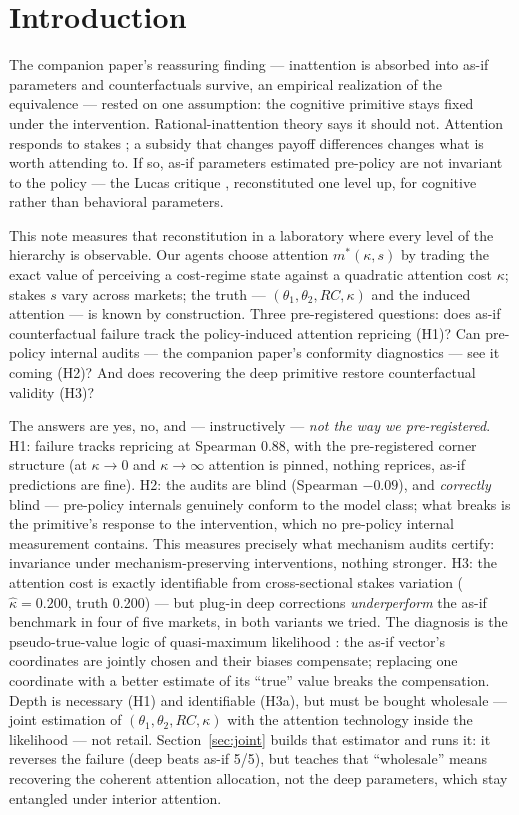 \documentclass[11pt]{article}
\newcommand{\mstar}{m^{*}}
\begin{document}
\section{Introduction}\label{sec:intro}

The companion paper's reassuring finding --- inattention is absorbed into
as-if parameters and counterfactuals survive, an empirical realization of
the \citet{fosgerau2020} equivalence --- rested on one assumption: the
cognitive primitive stays fixed under the intervention. Rational-inattention
theory says it should not. Attention responds to stakes
\citep{matejkamckay2015, gabaix2014, mackowiak2023}; a subsidy that changes
payoff differences changes what is worth attending to. If so, as-if
parameters estimated pre-policy are not invariant to the policy --- the
Lucas critique \citep{lucas1976}, reconstituted one level up, for cognitive
rather than behavioral parameters.

This note measures that reconstitution in a laboratory where every level of
the hierarchy is observable. Our agents choose attention $\mstar(\kappa, s)$
by trading the exact value of perceiving a cost-regime state against a
quadratic attention cost $\kappa$; stakes $s$ vary across markets; the
truth --- $(\theta_1, \theta_2, RC, \kappa)$ and the induced attention ---
is known by construction. Three pre-registered questions: does as-if
counterfactual failure track the policy-induced attention repricing (H1)?
Can pre-policy internal audits --- the companion paper's conformity
diagnostics --- see it coming (H2)? And does recovering the deep primitive
restore counterfactual validity (H3)?

The answers are yes, no, and --- instructively --- \emph{not the way we
pre-registered}. H1: failure tracks repricing at Spearman 0.88, with the
pre-registered corner structure (at $\kappa \to 0$ and $\kappa \to \infty$
attention is pinned, nothing reprices, as-if predictions are fine). H2:
the audits are blind (Spearman $-0.09$), and \emph{correctly} blind ---
pre-policy internals genuinely conform to the model class; what breaks is
the primitive's response to the intervention, which no pre-policy internal
measurement contains. This measures precisely what mechanism audits
certify: invariance under mechanism-preserving interventions, nothing
stronger. H3: the attention cost is exactly identifiable from
cross-sectional stakes variation ($\widehat{\kappa} = 0.200$, truth 0.200)
--- but plug-in deep corrections \emph{underperform} the as-if benchmark in
four of five markets, in both variants we tried. The diagnosis is the
pseudo-true-value logic of quasi-maximum likelihood \citep{white1982}: the
as-if vector's coordinates are jointly chosen and their biases compensate;
replacing one coordinate with a better estimate of its ``true'' value
breaks the compensation. Depth is necessary (H1) and identifiable (H3a),
but must be bought wholesale --- joint estimation of
$(\theta_1, \theta_2, RC, \kappa)$ with the attention technology inside the
likelihood --- not retail. Section~\ref{sec:joint} builds that estimator and
runs it: it reverses the failure (deep beats as-if 5/5), but teaches that
``wholesale'' means recovering the coherent attention allocation, not the
deep parameters, which stay entangled under interior attention.
\end{document}

